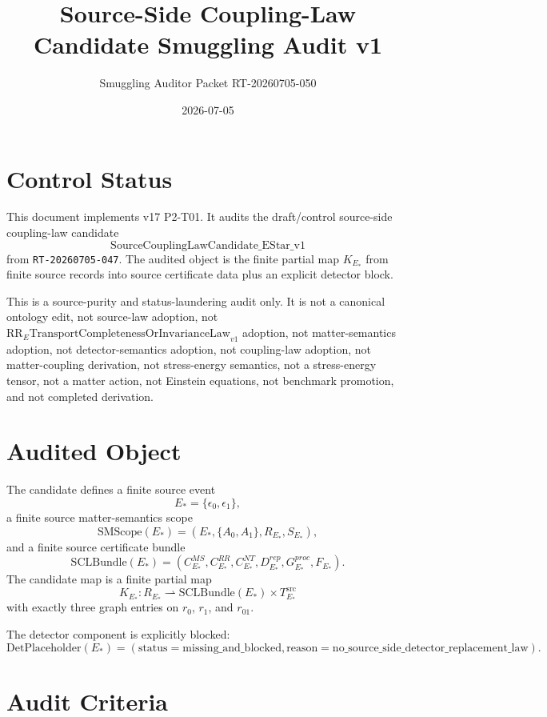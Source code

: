 \documentclass[11pt]{article}
\title{Source-Side Coupling-Law Candidate Smuggling Audit v1}
\author{Smuggling Auditor Packet RT-20260705-050}
\date{2026-07-05}
\newcommand{\EStar}{E_{\ast}}
\newcommand{\SMScope}{\mathrm{SMScope}}
\newcommand{\SCLBundle}{\mathrm{SCLBundle}}
\newcommand{\DetPlaceholder}{\mathrm{DetPlaceholder}}
\newcommand{\KStar}{K_{E_{\ast}}}
\newcommand{\Src}{\mathrm{src}}
\begin{document}
\maketitle

\section{Control Status}

This document implements v17 P2-T01. It audits the draft/control source-side
coupling-law candidate
\[
  \mathrm{SourceCouplingLawCandidate\_EStar\_v1}
\]
from \texttt{RT-20260705-047}. The audited object is the finite partial map
\(\KStar\) from finite source records into source certificate data plus an
explicit detector block.

This is a source-purity and status-laundering audit only. It is not a
canonical ontology edit, not source-law adoption, not
\(\mathrm{RR}_{E}\mathrm{TransportCompletenessOrInvarianceLaw}_{v1}\)
adoption, not matter-semantics adoption, not detector-semantics adoption, not
coupling-law adoption, not matter-coupling derivation, not stress-energy
semantics, not a stress-energy tensor, not a matter action, not Einstein
equations, not benchmark promotion, and not completed derivation.

\section{Audited Object}

The candidate defines a finite source event
\[
  \EStar=\{\epsilon_0,\epsilon_1\},
\]
a finite source matter-semantics scope
\[
  \SMScope(\EStar)=(\EStar,\{A_0,A_1\},R_{\EStar},S_{\EStar}),
\]
and a finite source certificate bundle
\[
  \SCLBundle(\EStar)=
  (C^{MS}_{\EStar},C^{RR}_{\EStar},C^{NT}_{\EStar},
   D^{rep}_{\EStar},G^{proc}_{\EStar},F_{\EStar}).
\]
The candidate map is a finite partial map
\[
  \KStar:R_{\EStar}\rightharpoonup
  \SCLBundle(\EStar)\times T_{\EStar}^{\Src}
\]
with exactly three graph entries on \(r_0\), \(r_1\), and \(r_{01}\).

The detector component is explicitly blocked:
\[
  \DetPlaceholder(\EStar)=
  (\mathrm{status}=\mathrm{missing\_and\_blocked},
   \mathrm{reason}=\mathrm{no\_source\_side\_detector\_replacement\_law}).
\]

\section{Audit Criteria}
\end{document}
